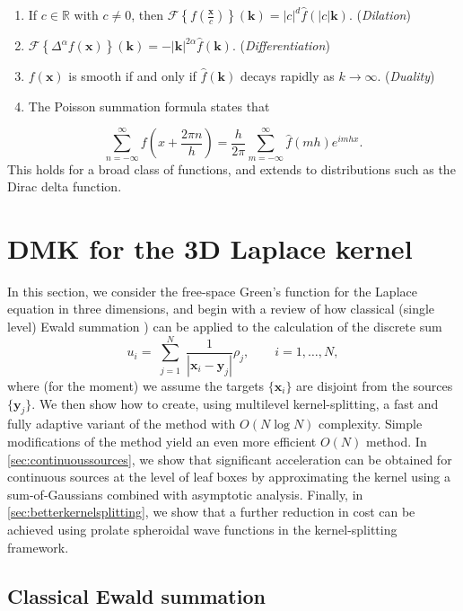 \documentclass[final,letterpaper]{siamart171218}
\newcommand{\be}{\begin{equation}}
\newcommand{\ee}{\end{equation}}
\newcommand{\x}{\boldsymbol{x}}
\newcommand{\y}{\boldsymbol{y}}
\newcommand{\bk}{\boldsymbol{k}}
\newcommand{\acron}{DMK }
\begin{document}
\vspace{.1in}

\begin{enumerate}[label=(\alph*)]
\item 
If $c\in \mathbb{R}$ with $c\ne 0$, then
  $\mathcal{F}\left\{f\left(\frac{\x}{c}\right)\right\}(\bk)=|c|^d\hat{f}(|c|\bk)$.
\hfill
({\em Dilation}) 
\item 
$\mathcal{F}\left\{\Delta^\alpha f(\x)\right\}(\bk) = -|\bk|^{2\alpha}\hat{f}(\bk)$.
\hfill
({\em Differentiation})
\item 
$f(\x)$ is smooth if and only if $\hat{f}(\bk)$ decays rapidly as $k\rightarrow \infty$.
\hfill ({\em Duality}) 
\item
The Poisson summation formula \cite{dym1975} states that
\end{enumerate}
\be\label{poissonsummation}
\sum_{n=-\infty}^\infty f\left(x+\frac{2\pi n}{h}\right) = \frac{h}{2\pi}\sum_{m=-\infty}^\infty
\hat{f}(mh)e^{imhx}.
\ee
This holds for a broad class of functions, and extends to distributions such
as the Dirac delta function.


\section{\acron for the 3D Laplace kernel}

In this section, we consider the free-space Green's function for the Laplace equation
in three dimensions, and begin with a review
of how classical (single level) Ewald summation
\cite{HE-1981,darden1993jcp,shamshirgar2021jcp})
can be applied to the calculation of the discrete sum
\be\label{laplacesum}
u_i=\sum_{\substack{j=1}}^{N}\frac{1}{|\x_i-\y_j|}\rho_j, \qquad i=1,\ldots,N,
\ee
where (for the moment) we assume the targets $\{ \x_i \}$ are disjoint from
the sources $\{ \y_j \}$.
We then show how to create, using multilevel kernel-splitting, a
fast and fully adaptive variant of the method with 
$O(N \log N)$ complexity. Simple modifications of the method yield an even more
efficient $O(N)$ method. 
In \cref{sec:continuoussources}, we show that significant
acceleration can be obtained for continuous sources at the level of leaf boxes 
by approximating the kernel using a sum-of-Gaussians combined with 
asymptotic analysis.  Finally,
in \cref{sec:betterkernelsplitting}, we show that a
further reduction in cost can be achieved using prolate spheroidal wave functions
in the kernel-splitting framework. 


\subsection{Classical Ewald summation}\label{sec:l3dgaussianks}
\end{document}
